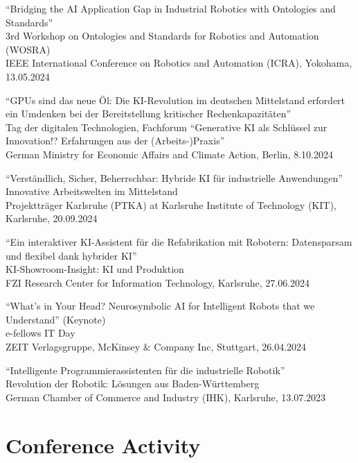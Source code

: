 \documentclass[11pt]{article} %
\begin{document}
\medskip


``Bridging the AI Application Gap in Industrial Robotics with Ontologies and Standards''\\
3rd Workshop on Ontologies and Standards for Robotics and Automation (WOSRA)\\
IEEE International Conference on Robotics and Automation (ICRA), Yokohama, 13.05.2024

\medskip

``GPUs sind das neue Öl: Die KI-Revolution im deutschen Mittelstand erfordert ein Umdenken bei der Bereitstellung kritischer Rechenkapazitäten''\\
Tag der digitalen Technologien, Fachforum ``Generative KI als Schlüssel zur Innovation!? Erfahrungen aus der (Arbeits-)Praxis''\\
German Ministry for Economic Affairs and Climate Action, Berlin, 8.10.2024

\medskip

``Verständlich, Sicher, Beherrschbar: Hybride KI für industrielle Anwendungen''\\
Innovative Arbeitswelten im Mittelstand\\
Projektträger Karlsruhe (PTKA) at Karlsruhe Institute of Technology (KIT), Karlsruhe, 20.09.2024

\medskip

``Ein interaktiver KI-Assistent für die Refabrikation mit Robotern: Datensparsam und flexibel dank hybrider KI''\\
KI-Showroom-Insight: KI und Produktion\\
FZI Research Center for Information Technology, Karlsruhe, 27.06.2024

\medskip

``What's in Your Head? Neurosymbolic AI for Intelligent Robots that we Understand'' (Keynote)\\
e-fellows IT Day\\
ZEIT Verlagsgruppe, McKinsey \& Company Inc, Stuttgart, 26.04.2024

\medskip

``Intelligente Programmierassistenten für die industrielle Robotik''\\
Revolution der Robotik: Lösungen aus Baden-Württemberg\\
German Chamber of Commerce and Industry (IHK), Karlsruhe, 13.07.2023

\section*{Conference Activity}
\end{document}

